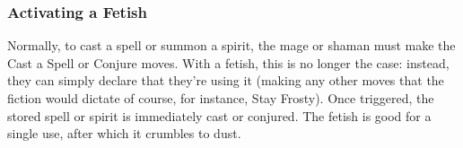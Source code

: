 \subsubsection{Activating a Fetish}
Normally, to cast a spell or summon a spirit, the mage or shaman must make the Cast a Spell or Conjure moves. With a fetish, this is no longer the case: instead, they can simply declare that they’re using it (making any other moves that the fiction would dictate of course, for instance, Stay Frosty). Once triggered, the stored spell or spirit is immediately cast or conjured. The fetish is good for a single use, after which it crumbles to dust.
